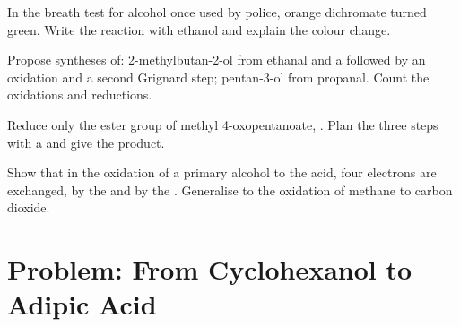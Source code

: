 \begin{exercise}[$\star\star$]\label{exo:b1:organic-redox:9}
In the breath test for alcohol once used by police, orange dichromate
turned green. Write the reaction with ethanol and explain the colour
change.
\end{exercise}

\begin{exercise}[$\star\star\star$]\label{exo:b1:organic-redox:10}
Propose syntheses of: 2-methylbutan-2-ol from ethanal and a  followed by an oxidation and a second Grignard step; pentan-3-ol
from propanal. Count the oxidations and reductions.
\end{exercise}

\begin{exercise}[$\star\star\star$]\label{exo:b1:organic-redox:11}
Reduce only the ester group of methyl 4-oxopentanoate,
. Plan the three steps with a  and give
the product.
\end{exercise}

\begin{exercise}[$\star\star\star$]\label{exo:b1:organic-redox:12}
Show that in the oxidation of a primary alcohol to the acid, four
electrons are exchanged, by the  and by the
. Generalise to the oxidation of methane to carbon dioxide.
\end{exercise}

\section{Problem: From Cyclohexanol to Adipic Acid}

